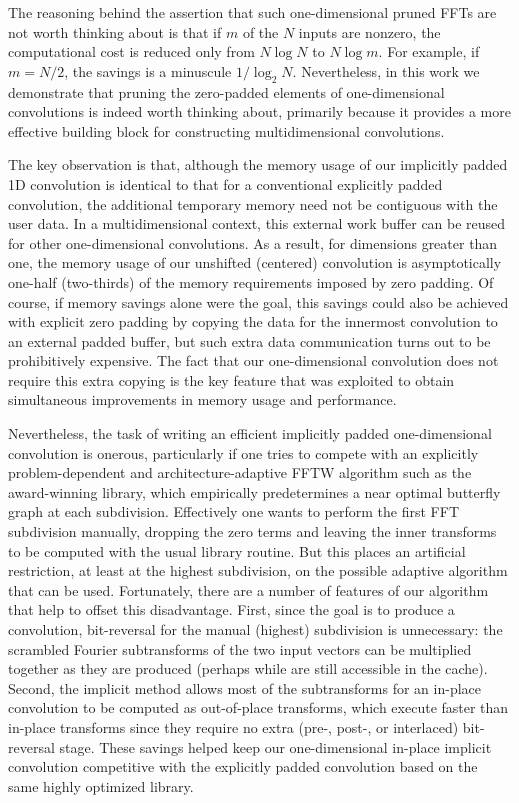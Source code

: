 \documentclass[final]{siamltex}
\begin{document}
The reasoning behind the assertion that such one-dimensional pruned FFTs
are not worth thinking about is that if $m$ of the $N$ inputs are nonzero,
the computational cost is reduced only from $N\log N$ to $N\log m$.
For example, if $m=N/2$, the savings is a minuscule $1/\log_2 N$.
Nevertheless, in this work we demonstrate that pruning the zero-padded
elements of one-dimensional convolutions is indeed worth thinking about,
primarily because it provides a more effective building block for constructing
multidimensional convolutions.

The key observation is that, although the memory usage of our implicitly
padded 1D convolution is identical to that for a conventional explicitly
padded convolution, the additional temporary memory need not be contiguous
with the user data.  In a multidimensional context, this external work
buffer can be reused for other one-dimensional convolutions.
As a result, for dimensions greater than one, the memory usage of our
unshifted (centered) convolution is asymptotically one-half (two-thirds)
of the memory requirements imposed by zero padding.
Of course, if memory savings alone were the goal, this savings could
also be achieved with explicit zero padding by copying the data for the
innermost convolution to an external padded buffer, but such extra data
communication turns out to be prohibitively expensive. The fact that our
one-dimensional convolution does not require this extra copying is the key
feature that was exploited to obtain simultaneous improvements in memory
usage and performance.

Nevertheless, the task of writing an efficient implicitly padded one-dimensional
convolution is onerous, particularly if one tries to compete with an
explicitly problem-dependent and architecture-adaptive FFTW algorithm such
as the award-winning \cite{FFTW} library, which empirically predetermines a
near optimal butterfly graph at each subdivision. Effectively one wants to
perform the first FFT subdivision manually, dropping the zero terms and
leaving the inner transforms to be computed with the usual library
routine. But this places an artificial restriction, at least at the highest
subdivision, on the possible adaptive algorithm that can be
used. Fortunately, there are a number of features of our algorithm that
help to offset this disadvantage. First, since the goal is to produce a
convolution, bit-reversal for the manual (highest) subdivision is
unnecessary: the scrambled Fourier subtransforms of the two input vectors
can be multiplied together as they are produced (perhaps while are still
accessible in the cache). Second, the implicit method allows most 
of the subtransforms for an in-place convolution to be computed as
out-of-place transforms, which execute faster than in-place transforms
since they require no extra (pre-, post-, or interlaced) bit-reversal stage.
These savings helped keep our one-dimensional in-place implicit convolution
competitive with the explicitly padded convolution based on the same highly
optimized library.
\end{document}

